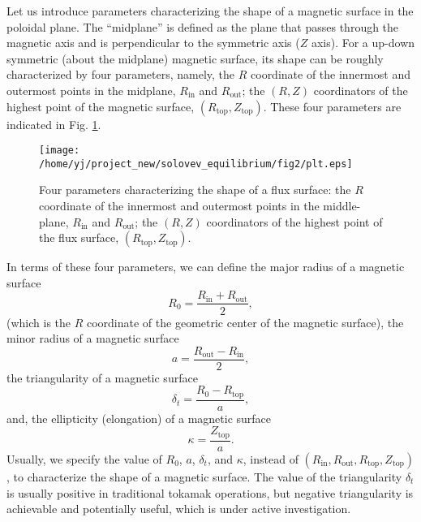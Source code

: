 \documentclass{llncs}
\newcommand{\tmop}[1]{\ensuremath{\operatorname{#1}}}
\begin{document}
Let us introduce parameters characterizing the shape of a magnetic surface in
the poloidal plane. The ``midplane'' is defined as the plane that passes
through the magnetic axis and is perpendicular to the symmetric axis ($Z$
axis). For a up-down symmetric (about the midplane) magnetic surface, its
shape can be roughly characterized by four parameters, namely, the $R$
coordinate of the innermost and outermost points in the midplane,
$R_{\tmop{in}}$ and $R_{\tmop{out}}$; the $(R, Z)$ coordinators of the highest
point of the magnetic surface, $(R_{\tmop{top}}, Z_{\tmop{top}})$. These four
parameters are indicated in Fig. \ref{8-9-p1}.

\begin{figure}[h]
  \texttt{[image: /home/yj/project\_new/solovev\_equilibrium/fig2/plt.eps]}
  \caption{\label{8-9-p1}Four parameters characterizing the shape of a flux
  surface: the $R$ coordinate of the innermost and outermost points in the
  middle-plane, $R_{\tmop{in}}$ and $R_{\tmop{out}}$; the $(R, Z)$
  coordinators of the highest point of the flux surface, $(R_{\tmop{top}},
  Z_{\tmop{top}})$.}
\end{figure}

In terms of these four parameters, we can define the major radius of a
magnetic surface
\begin{equation}
  \label{4-25-p1} R_0 = \frac{R_{\tmop{in}} + R_{\tmop{out}}}{2},
\end{equation}
(which is the $R$ coordinate of the geometric center of the magnetic surface),
the minor radius of a magnetic surface
\begin{equation}
  \label{4-25-p2} a = \frac{R_{\tmop{out}} - R_{\tmop{in}}}{2},
\end{equation}
the triangularity of a magnetic surface
\begin{equation}
  \label{4-25-p3} \delta_t = \frac{R_0 - R_{\tmop{top}}}{a},
\end{equation}
and, the ellipticity (elongation) of a magnetic surface
\begin{equation}
  \label{4-25-p4} \kappa = \frac{Z_{\tmop{top}}}{a} .
\end{equation}
Usually, we specify the value of $R_0$, $a$, $\delta_t$, and $\kappa$, instead
of $(R_{\tmop{in}}, R_{\tmop{out}}, R_{\tmop{top}}, Z_{\tmop{top}})$, to
characterize the shape of a magnetic surface. The value of the triangularity
$\delta_t$ is usually positive in traditional tokamak operations, but negative
triangularity is achievable and potentially useful, which is under active
investigation.
\end{document}
